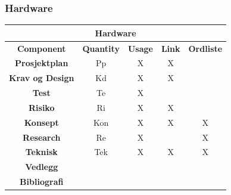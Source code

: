 \documentclass[11pt,a4paper, titlepage]{article}
\begin{document}
\subsubsection{Hardware}
	\begin{center}           
    \begin{longtable}{| c | c | c | c | c |}
              \hline
\multicolumn{5}{|c|}{\textbf{Hardware}} \\ \hline \endhead
\textbf{Component} & \textbf{Quantity} & \textbf{Usage} & \textbf{Link} & \textbf{Ordliste} \\ \hline             
              \textbf{Prosjektplan} &  Pp & X & X & \\ \hline
              
              \textbf{Krav og Design} &  Kd & X & X &  \\ \hline
             
              \textbf{Test} & Te & X & & \\ \hline
              
              \textbf{Risiko} & Ri & X & X &\\ \hline
              
              \textbf{Konsept} & Kon & X & X & X \\ \hline
              
              \textbf{Research} & Re & X &  & X \\  \hline
              
              \textbf{Teknisk} & Tek & X & X & X \\  \hline
              
              \textbf{Vedlegg} & & & & \\  \hline
              
              \textbf{Bibliografi} & & & & \\  \hline
                                       
\end{longtable}
\end{center}      
\end{document}

